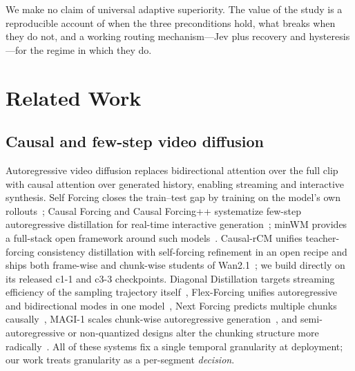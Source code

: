 \documentclass[journal]{IEEEtran}
\newcommand{\cfine}{\textup{c1-1}}
\newcommand{\ccoarse}{\textup{c3-3}}
\begin{document}
We make no claim of universal adaptive superiority. The value of the study is a reproducible account of when the three preconditions hold, what breaks when they do not, and a working routing mechanism---Jev plus recovery and hysteresis---for the regime in which they do.

\section{Related Work}
\label{sec:related}

\subsection{Causal and few-step video diffusion}
Autoregressive video diffusion replaces bidirectional attention over the full clip with causal attention over generated history, enabling streaming and interactive synthesis. Self Forcing closes the train--test gap by training on the model's own rollouts~\cite{huangSelfForcingBridging2025}; Causal Forcing and Causal Forcing++ systematize few-step autoregressive distillation for real-time interactive generation~\cite{zhuCausalForcingAutoregressive2026a,zhaoCausalForcingScalable2026a}; minWM provides a full-stack open framework around such models~\cite{zhaoMinWMFullStackOpenSource2026a}. Causal-rCM unifies teacher-forcing consistency distillation with self-forcing refinement in an open recipe and ships both frame-wise and chunk-wise students of Wan2.1~\cite{zhengCausalrCMUnifiedTeacherForcing2026,wan2025wan}; we build directly on its released \cfine{} and \ccoarse{} checkpoints. Diagonal Distillation targets streaming efficiency of the sampling trajectory itself~\cite{liuStreamingAutoregressiveVideo2026}, Flex-Forcing unifies autoregressive and bidirectional modes in one model~\cite{maFlexForcingUnifiedAutoregressive2026}, Next Forcing predicts multiple chunks causally~\cite{xuNextForcingCausal2026}, MAGI-1 scales chunk-wise autoregressive generation~\cite{aiMAGI1AutoregressiveVideo2025}, and semi-autoregressive or non-quantized designs alter the chunking structure more radically~\cite{renNextBlockPrediction2025,dengAutoregressiveVideoGeneration2025}. All of these systems fix a single temporal granularity at deployment; our work treats granularity as a per-segment \emph{decision}.
\end{document}
